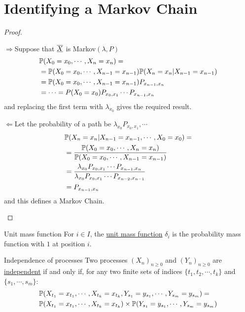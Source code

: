 \documentclass[../Main.tex]{subfiles}
\begin{document}
\section{Identifying a Markov Chain}
\begin{proof}
    \begin{proofdirection}{$\Rightarrow$}{Suppose that $\chain{X}$ is Markov$(\lambda, P)$}
        \begin{align*}
            &\P(X_0 = x_0, \cdots, X_n = x_n) = \\
            &= \P(X_0 = x_0, \cdots, X_{n-1} = x_{n-1}) \P(X_n = x_n | X_{n-1} = x_{n-1}) \\
            &= \P(X_0 = x_0, \cdots, X_{n-1} = x_{n-1}) P_{x_{n-1}, x_n} \\
            &= \cdots = P(X_0 = x_0) P_{x_0, x_1} \cdots P_{x_{n-1}, x_n} \\
        \end{align*}
        and replacing the first term with $\lambda_{x_0}$ gives the required result.
    \end{proofdirection}
    \begin{proofdirection}{$\Leftarrow$}{Let the probability of a path be $\lambda_{x_0} P_{{x_0}, {x_1}}, \cdots$}
        \begin{align*}
            &\P(X_n = x_n | X_{n - 1} = x_{n-1}, \cdots, X_0 = x_0) = \\
            &= \frac{\P(X_0 = x_0, \cdots, X_n = x_n)}{\P(X_0 = x_0, \cdots, X_{n-1} = x_{n-1})} \\
            &= \frac{\lambda_{x_0} P_{x_0, x_1} \cdots P_{x_{n-1}, x_n}}{\lambda_{x_0} P_{x_0, x_1} \cdots P_{x_{n-2}, x_{n-1}}} \\
            &= P_{x_{n-1}, x_n}
        \end{align*}        
        and this defines a Markov Chain.
    \end{proofdirection}
\end{proof}
\begin{definition}{Unit mass function}
    For $i \in I$, the \underline{unit mass function} $\delta_i$ is the probability mass function with $1$ at position $i$.
\end{definition}
\begin{definition}{Independence of processes}
    Two processes $(X_n)_{n \geq 0}$ and $(Y_n)_{n \geq 0}$ are \underline{independent} if and only if, for any two finite sets of indices $\{t_1, t_2, \cdots, t_k\}$ and $\{s_1, \cdots, s_m\}$:
    \begin{align*}
        &\P(X_{t_1} = x_{t_1}, \cdots, X_{t_k} = x_{t_k}, Y_{s_1} = y_{s_1}, \cdots, Y_{s_m} = y_{s_m}) = \\
        &\P(X_{t_1} = x_{t_1}, \cdots, X_{t_k} = x_{t_k}) \times \P(Y_{s_1} = y_{s_1}, \cdots, Y_{s_m} = y_{s_m})
    \end{align*}
\end{definition}
\end{document}
